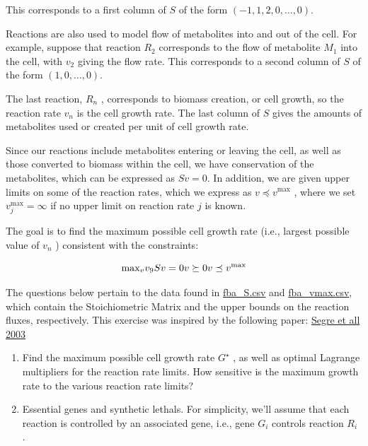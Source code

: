 \documentclass[
  letterpaper,
  DIV=11,
  numbers=noendperiod]{scrartcl}
\begin{document}
This corresponds to a first column of \(S\) of the form
\((−1, 1, 2, 0, \dots , 0)\).

Reactions are also used to model flow of metabolites into and out of the
cell. For example, suppose that reaction \(R_2\) corresponds to the flow
of metabolite \(M_1\) into the cell, with \(v_2\) giving the flow rate.
This corresponds to a second column of \(S\) of the form
\((1, 0, . . . , 0)\).

The last reaction, \(R_n\) , corresponds to biomass creation, or cell
growth, so the reaction rate \(v_n\) is the cell growth rate. The last
column of \(S\) gives the amounts of metabolites used or created per
unit of cell growth rate.

Since our reactions include metabolites entering or leaving the cell, as
well as those converted to biomass within the cell, we have conservation
of the metabolites, which can be expressed as \(Sv = 0\). In addition,
we are given upper limits on some of the reaction rates, which we
express as \(v \preceq v^{\mathrm{max}}\) , where we set
\(v_{j}^{\mathrm{max}} = \infty\) if no upper limit on reaction rate
\(j\) is known.

The goal is to find the maximum possible cell growth rate (i.e., largest
possible value of \(v_n\) ) consistent with the constraints:

\[
\mathrm{max}_v v_9 \\
Sv = 0 \\
v \succeq 0 \\
v \preceq v^{\mathrm{max}} 
\]

The questions below pertain to the data found in
\href{https://github.com/georgehagstrom/DATA609Spring2025/blob/main/website/assignments/labs/labData/fba_S.csv}{fba\_S.csv}
and
\href{https://github.com/georgehagstrom/DATA609Spring2025/blob/main/website/assignments/labs/labData/fba_vmax.csv}{fba\_vmax.csv},
which contain the Stoichiometric Matrix and the upper bounds on the
reaction fluxes, respectively. This exercise was inspired by the
following paper:
\href{https://www.liebertpub.com/doi/abs/10.1089/153623103322452413}{Segre
et all 2003}

\begin{enumerate}
\def\labelenumi{(\alph{enumi})}
\item
  Find the maximum possible cell growth rate \(G^{\star}\) , as well as
  optimal Lagrange multipliers for the reaction rate limits. How
  sensitive is the maximum growth rate to the various reaction rate
  limits?
\item
  Essential genes and synthetic lethals. For simplicity, we'll assume
  that each reaction is controlled by an associated gene, i.e., gene
  \(G_i\) controls reaction \(R_i\) .
\end{enumerate}
\end{document}
